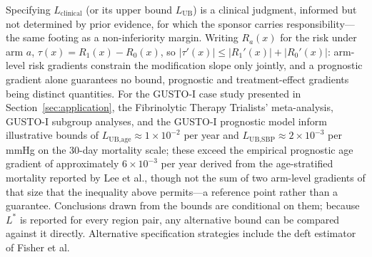 \documentclass[AMA,Times1COL]{WileyNJDv5}
\begin{document}
Specifying $L_{\text{clinical}}$ (or its upper bound $L_{\text{UB}}$) is a clinical judgment, informed but not determined by prior evidence, for which the sponsor carries responsibility---the same footing as a non-inferiority margin. Writing $R_a(x)$ for the risk under arm $a$, $\tau(x) = R_1(x) - R_0(x)$, so $|\tau'(x)| \leq |R_1'(x)| + |R_0'(x)|$: arm-level risk gradients constrain the modification slope only jointly, and a prognostic gradient alone guarantees no bound, prognostic and treatment-effect gradients being distinct quantities.\cite{ballman2015,kent2020} For the GUSTO-I case study presented in Section~\ref{sec:application}, the Fibrinolytic Therapy Trialists' meta-analysis\cite{ftt1994}, GUSTO-I subgroup analyses,\cite{gusto1993} and the GUSTO-I prognostic model\cite{lee1995} inform illustrative bounds of $L_{\text{UB,age}} \approx 1 \times 10^{-2}$ per year and $L_{\text{UB,SBP}} \approx 2 \times 10^{-3}$ per mmHg on the 30-day mortality scale; these exceed the empirical prognostic age gradient of approximately $6 \times 10^{-3}$ per year derived from the age-stratified mortality reported by Lee et al.,\cite{lee1995} though not the sum of two arm-level gradients of that size that the inequality above permits---a reference point rather than a guarantee. Conclusions drawn from the bounds are conditional on them; because $L^*$ is reported for every region pair, any alternative bound can be compared against it directly. Alternative specification strategies include the deft estimator of Fisher et al.\cite{fisher2017}
\end{document}
